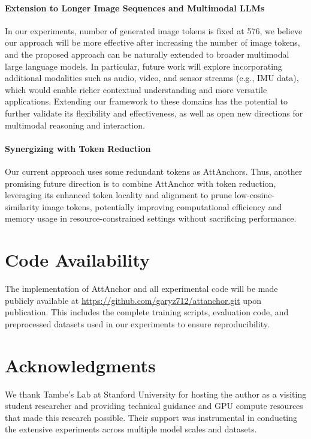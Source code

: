 \documentclass[11pt]{article}
\begin{document}
\paragraph{Extension to Longer Image Sequences and Multimodal LLMs} 
In our experiments, number of generated image tokens is fixed at 576, we believe our approach will be more effective after increasing the number of image tokens, and the proposed approach can be naturally extended to broader multimodal large language models. In particular, future work will explore incorporating additional modalities such as audio, video, and sensor streams (e.g., IMU data), which would enable richer contextual understanding and more versatile applications. Extending our framework to these domains has the potential to further validate its flexibility and effectiveness, as well as open new directions for multimodal reasoning and interaction.

\paragraph{Synergizing with Token Reduction} Our current approach uses some redundant tokens as AttAnchors. Thus, another promising future direction is to combine AttAnchor  with token reduction, leveraging its enhanced token locality and alignment to prune low-cosine-similarity image tokens, potentially improving computational efficiency and memory usage in resource-constrained settings without sacrificing performance.


\section{Code Availability}

The implementation of AttAnchor and all experimental code will be made publicly available at \url{https://github.com/garyz712/attanchor.git} upon publication. This includes the complete training scripts, evaluation code, and preprocessed datasets used in our experiments to ensure reproducibility.

\section{Acknowledgments}

We thank Tambe's Lab at Stanford University for hosting the author as a visiting student researcher and providing technical guidance and GPU compute resources that made this research possible. Their support was instrumental in conducting the extensive experiments across multiple model scales and datasets.
\end{document}
